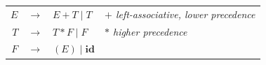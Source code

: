 \begin{center}
\renewcommand{\arraystretch}{1.3}
\begin{tabular}{@{}r@{\;}c@{\;}l@{\qquad}l@{}}
$E$ & $\to$ & $E + T \mid T$ & \textit{$+$ left-associative, lower precedence}\\
$T$ & $\to$ & $T * F \mid F$ & \textit{$*$ higher precedence}\\
$F$ & $\to$ & $(E) \mid \mathbf{id}$ & \\
\end{tabular}
\end{center}
